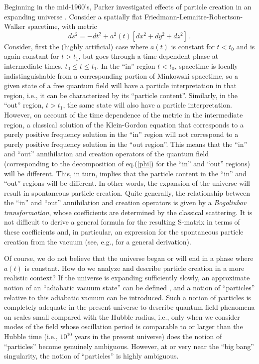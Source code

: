 Beginning in the mid-1960's, Parker investigated effects of
particle creation in an expanding universe \cite{p1,p2}. Consider a
spatially flat Friedmann-Lemaitre-Robertson-Walker spacetime, with metric
\begin{equation}
ds^2 = - dt^2 + a^2(t) [dx^2 + dy^2 + dz^2] \, .
\end{equation}
Consider, first the (highly artificial) case where $a(t)$ is constant
for $t<t_0$ and is again constant for $t>t_1$, but goes through a
time-dependent phase at intermediate times, $t_0 \leq t \leq t_1$. In
the ``in'' region $t<t_0$, spacetime is locally indistinguishable from
a corresponding portion of Minkowski spacetime, so a given state of a
free quantum field will have a particle interpretation in that region,
i.e., it can be characterized by its ``particle content''. Similarly,
in the ``out'' region, $t>t_1$, the same state will also have a
particle interpretation. However, on account of the time dependence of
the metric in the intermediate region, a classical solution of the
Klein-Gordon equation that corresponds to a purely positive frequency
solution in the ``in'' region will not correspond to a purely positive
frequency solution in the ``out region''. This means that the ``in''
and ``out'' annihilation and creation operators of the quantum field
(corresponding to the decomposition of eq.(\ref{phi}) for the ``in''
and ``out'' regions) will be different. This, in turn, implies that
the particle content in the ``in'' and ``out'' regions will be
different. In other words, the expansion of the universe will result
in spontaneous particle creation.  Quite generally, the relationship
between the ``in'' and ``out'' annihilation and creation operators is
given by a {\it Bogoliubov transformation}, whose coefficients are
determined by the classical scattering. It is not difficult to derive
a general formula for the resulting S-matrix in terms of these
coefficients and, in particular, an expression for the spontaneous
particle creation from the vacuum (see, e.g., \cite{w2} for a general
derivation).

Of course, we do not believe that the universe began or will end in a
phase where $a(t)$ is constant. How do we analyze and describe
particle creation in a more realistic context? If the universe is
expanding sufficiently slowly, an approximate notion of an ``adiabatic
vacuum state'' can be defined \cite{p2}, and a notion of ``particles''
relative to this adiabatic vacuum can be introduced. Such a notion of
particles is completely adequate in the present universe to describe
quantum field phenomena on scales small compared with the Hubble
radius, i.e., only when we consider modes of the field whose
oscillation period is comparable to or larger than the Hubble time
(i.e., $10^{10}$ years in the present universe) does the notion of
``particles'' become genuinely ambiguous.  However, at or very near
the ``big bang'' singularity, the notion of ``particles'' is highly
ambiguous.

